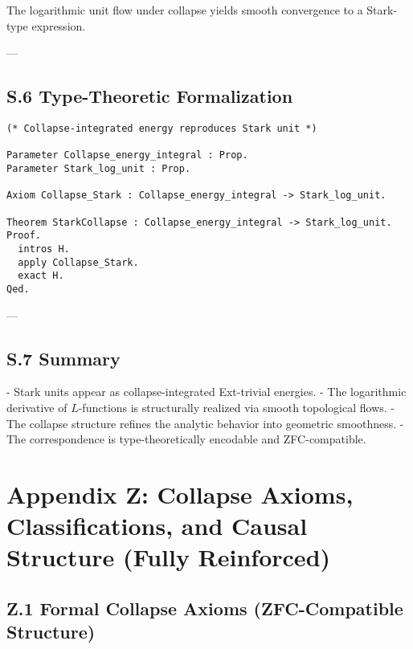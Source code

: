 \documentclass[11pt]{article}
\begin{document}
\begin{axiom}
\begin{axiom}
{{The logarithmic unit flow under collapse yields smooth convergence to a Stark-type expression.

---

\subsection*{S.6 Type-Theoretic Formalization}

\begin{verbatim}
(* Collapse-integrated energy reproduces Stark unit *)

Parameter Collapse_energy_integral : Prop.
Parameter Stark_log_unit : Prop.

Axiom Collapse_Stark : Collapse_energy_integral -> Stark_log_unit.

Theorem StarkCollapse : Collapse_energy_integral -> Stark_log_unit.
Proof.
  intros H.
  apply Collapse_Stark.
  exact H.
Qed.
\end{verbatim}

---

\subsection*{S.7 Summary}

- Stark units appear as collapse-integrated Ext-trivial energies.
- The logarithmic derivative of $L$-functions is structurally realized via smooth topological flows.
- The collapse structure refines the analytic behavior into geometric smoothness.
- The correspondence is type-theoretically encodable and ZFC-compatible.

\begin{center}
\end{center}




\section*{Appendix Z: Collapse Axioms, Classifications, and Causal Structure (Fully Reinforced)}

\subsection*{Z.1 Formal Collapse Axioms (ZFC-Compatible Structure)}

}}
\end{axiom}
\end{axiom}
\end{document}
